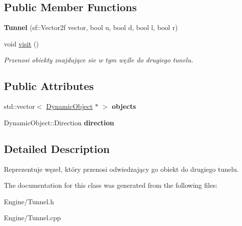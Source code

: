 \subsection*{Public Member Functions}
\begin{DoxyCompactItemize}
\item 
\mbox{\label{classTunnel_aec0254581076e1ea6161453e14ba7c7b}} 
{\bfseries Tunnel} (sf\+::\+Vector2f vector, bool u, bool d, bool l, bool r)
\item 
\mbox{\label{classTunnel_af17955c4f2d0bf4ff7a3cf6d00d02660}} 
void \hyperlink{classTunnel_af17955c4f2d0bf4ff7a3cf6d00d02660}{visit} ()
\begin{DoxyCompactList}\small\item\em Przenosi obiekty znajdujące sie w tym węźle do drugiego tunelu. \end{DoxyCompactList}\end{DoxyCompactItemize}
\subsection*{Public Attributes}
\begin{DoxyCompactItemize}
\item 
\mbox{\label{classTunnel_aba117d6f2bc79be7fa3d86ec121a16c3}} 
std\+::vector$<$ \hyperlink{classDynamicObject}{Dynamic\+Object} $\ast$ $>$ {\bfseries objects}
\item 
\mbox{\label{classTunnel_a0dc4271e155fb13ca1eccee6eb8eaa2f}} 
Dynamic\+Object\+::\+Direction {\bfseries direction}
\end{DoxyCompactItemize}


\subsection{Detailed Description}
Reprezentuje węzeł, który przenosi odwiedzający go obiekt do drugiego tunelu. 

The documentation for this class was generated from the following files\+:\begin{DoxyCompactItemize}
\item 
Engine/Tunnel.\+h\item 
Engine/Tunnel.\+cpp\end{DoxyCompactItemize}
